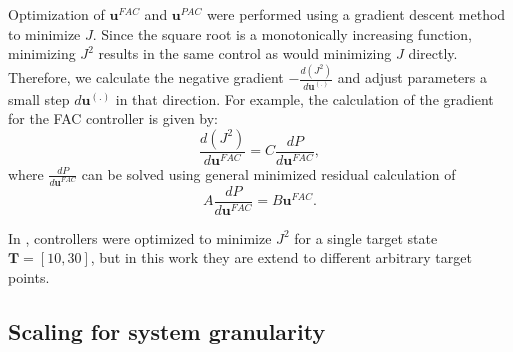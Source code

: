 \documentclass[12pt]{iopart}
\begin{document}
Optimization of $\mathbf{u}^{FAC}$ and $\mathbf{u}^{PAC}$ were performed using a gradient descent method to minimize $J$. Since the square root is a monotonically increasing function, minimizing $J^2$ results in the same control as would minimizing $J$ directly. Therefore, we calculate the negative gradient $-\frac{d(J^2)}{d\mathbf{u}^{(.)}}$ and adjust parameters a small step $d\mathbf{u}^{(.)}$ in that direction. For example, the calculation of the gradient for the FAC controller is given by:
\begin{equation}
\frac{d(J^2)}{d\mathbf{u}^{FAC}}=C \frac{dP}{d\mathbf{u}^{FAC}},
\end{equation}
where $\frac{dP}{d\mathbf{u}^{FAC}}$ can be solved using general minimized residual calculation of
\begin{equation}
A \frac{dP}{d\mathbf{u}^{FAC}}=B \mathbf{u}^{FAC}.
\end{equation}

In \cite{May2021}, controllers were optimized to minimize $J^2$ for a single target state $\mathbf{T} = [10,30]$, but in this work they are extend to different arbitrary target points.


\subsection{Scaling for system granularity}\label{sec:Scaling}
%
%
\end{document}
